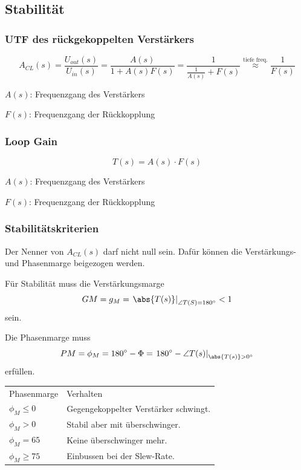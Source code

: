 \subsection{Stabilität}

\subsubsection{UTF des rückgekoppelten Verstärkers}
\[
    A_{CL}(s) = \frac{U_{out} (s)}{U_{in}(s)}
    = \frac{A(s)}{1+A(s) F(s)}
    = \frac{1}{\frac{1}{A(s)}+F(s)}
    \overset{\text{tiefe freq.}}{\approx} \frac{1}{F(s)}
\]

$A(s)$: Frequenzgang des Verstärkers

$F(s)$: Frequenzgang der Rückkopplung

\subsubsection{Loop Gain} %
\[
    T(s) = A(s) \cdot F(s)
\]

$A(s)$: Frequenzgang des Verstärkers

$F(s)$: Frequenzgang der Rückkopplung

\subsubsection{Stabilitätskriterien}
Der Nenner von $A_{CL}(s)$ darf nicht null sein.
Dafür können die Verstärkungs- und Phasenmarge beigezogen werden.

Für Stabilität muss die Verstärkungsmarge 
\[
    GM = g_M = \left.\abs{T(s)} \right|_{\angle T(S) = 180^\circ} < 1
\]
sein.

Die Phasenmarge muss
\[
    PM = \phi_M = 180^\circ - \Phi =  \left. 180^\circ - \angle T(s) \right|_{\abs{T(s)} > 0^\circ}
\]
erfüllen.

\smallskip
\begin{center}
    \begin{tabular}{ll}
        Phasenmarge & Verhalten \\
        $\phi_M \leq 0$ & Gegengekoppelter Verstärker schwingt. \\
        $\phi_M > 0$ & Stabil aber mit überschwinger. \\
        $\phi_M = 65$ & Keine überschwinger mehr. \\
        $\phi_M \geq 75$ & Einbussen bei der Slew-Rate.\\
    \end{tabular}
\end{center}


